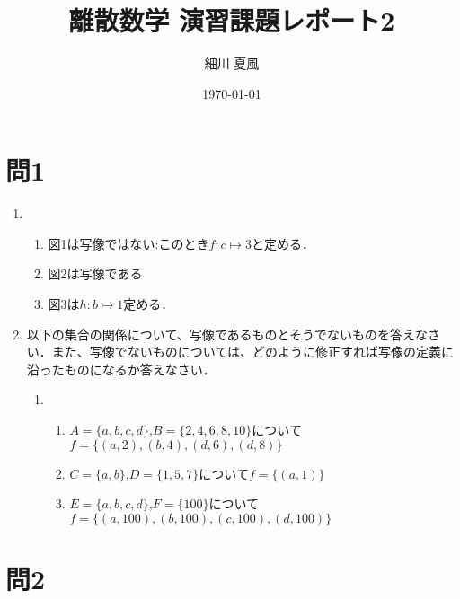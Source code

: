 \documentclass[uplatex]{jsarticle}
\title{離散数学 演習課題レポート2}
\author{細川 夏風}
\date{\today}
\begin{document}
\maketitle

\section{問1}

\renewcommand{\theenumi}{(\arabic{enumi})}
\begin{enumerate}
\vspace{12pt}
	\item
		\begin{enumerate}
			\item 図1は写像ではない:このとき$f:c \mapsto 3$と定める．
			\item 図2は写像である
			\item 図3は$h:b \mapsto 1$定める．
		\end{enumerate}
	
	\item 
		以下の集合の関係について、写像であるものとそうでないものを答えなさい．また、写像でないものについては、どのように修正すれば写像の定義に沿ったものになるか答えなさい．
		\begin{enumerate}

			\item
			\begin{enumerate}
				\item 
					$A=\{a,b,c,d\}$,$B=\{2,4,6,8,10\}$について$f=\{(a,2),(b,4),(d,6),(d,8)\}$
				\item
					$C=\{a,b\}$,$D=\{1,5,7\}$について$f=\{(a,1)\}$
				\item
					$E=\{a,b,c,d\}$,$F=\{100\}$について$f=\{(a,100),(b,100),(c,100),(d,100)\}$
			\end{enumerate}
		\end{enumerate}
\end{enumerate}

\section{問2}
\end{document}
